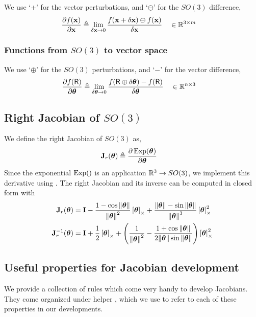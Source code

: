 We use `+' for the vector perturbations, and `$\ominus$' for the $SO(3)$ difference,
%
\begin{align}
\frac{\partial f({\bf x})}{\partial{\bf x}} &\triangleq \lim_{\delta{\bf x}\to0} \frac{ f({\bf x}+\delta{\bf x})\ominus f({\bf x})}{\delta{\bf x}} && \in {\mathbb R}^{3\times m} \label{equ:dif_RtoSO3}
\end{align}


\subsubsection{Functions from $SO(3)$ to vector space}


We use `$\oplus$' for the $SO(3)$ perturbations, and `$-$' for the vector difference,
%
\begin{align}
\frac{\partial f(\mathsf R)}{\partial{{\bm \theta}}} &\triangleq \lim_{\delta{{\bm \theta}}\to0} \frac{f(\mathsf R\oplus\delta{{\bm \theta}}) - f(\mathsf R)}{\delta{{\bm \theta}}} && \in {\mathbb R}^{n\times 3} \label{equ:jacobian_SO3_Rn}
\end{align}



\subsection{Right Jacobian of $SO(3)$ }

We define the right Jacobian of $SO(3)$ as, 
%
\begin{align}
{\bf J}_r({{\bm \theta}}) &\triangleq \frac{\partial\operatorname*{Exp}({{\bm \theta}})}{\partial{{\bm \theta}}} 
\end{align}
%
Since the exponential $\operatorname*{Exp}()$ is an application ${\mathbb R}^3\to SO(3)$,
we implement this derivative using .
The right Jacobian and its inverse can be computed in closed form with
%
\begin{align}
{\bf J}_r({{\bm \theta}}) &= {\bf I} - \frac{1-\cos{\left\|{{\bm \theta}}\right\|}}{{\left\|{{\bm \theta}}\right\|}^2}\left[{{\bm \theta}}\right]_\times + \frac{{\left\|{{\bm \theta}}\right\|}-\sin{\left\|{{\bm \theta}}\right\|}}{{\left\|{{\bm \theta}}\right\|}^3}\left[{{\bm \theta}}\right]_\times^2 \\
{\bf J}_r^{-1}({{\bm \theta}}) &= {\bf I} + \frac12\left[{{\bm \theta}}\right]_\times + \left(\frac1{{\left\|{{\bm \theta}}\right\|}^2} - \frac{1+\cos{\left\|{{\bm \theta}}\right\|}}{2{\left\|{{\bm \theta}}\right\|}\sin{\left\|{{\bm \theta}}\right\|}}\right)\left[{{\bm \theta}}\right]_\times^2
\end{align}






\subsection{Useful properties for Jacobian development}
\label{sec:DosDonts}

We provide a collection of rules which come very handy to develop Jacobians. They come organized under helper \!\!\!\!, which we use to refer to each of these properties in our developments.


